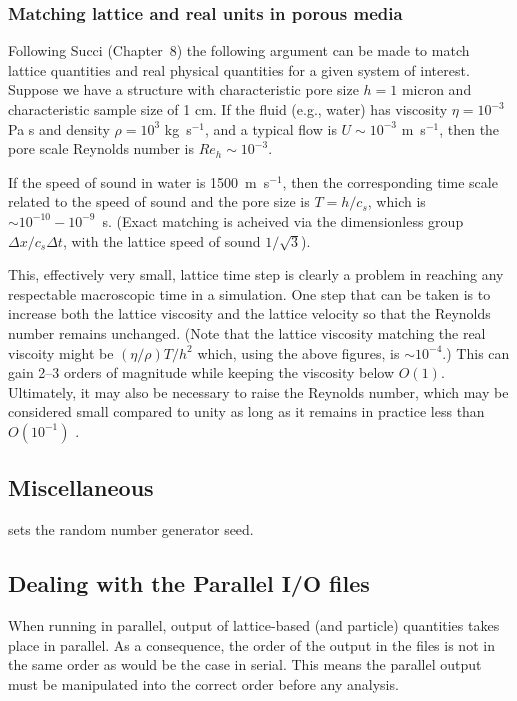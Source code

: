\subsubsection{Matching lattice and real units in porous media}

Following Succi \cite{succi} (Chapter~8) the following argument
can be made to match lattice quantities and real physical
quantities for a given system of interest. Suppose we have
a structure with characteristic pore size $h = 1$ micron
and characteristic sample size of 1 cm. If the fluid
(e.g., water) has viscosity $\eta = 10^{-3}$ Pa s and density
$\rho = 10^3$ kg~s$^{-1}$, and a typical flow is
$U \sim 10^{-3}$ m~s$^{-1}$, then the pore scale Reynolds
number is $Re_h \sim 10^{-3}$.

If the speed of sound in water is 1500~m~s$^{-1}$,
then the corresponding time scale related to the
speed of sound and the pore size is $T = h/ c_s$,
which is $\sim 10^{-10}-10^{-9}$~s. (Exact matching
is acheived via the dimensionless group $\Delta x / c_s\Delta t$,
with the lattice speed of sound $1/\sqrt{3}$).

This, effectively very small, lattice
time step is clearly a problem in reaching any respectable 
macroscopic time in a simulation.
One step that can be taken is to increase both the lattice
viscosity and the lattice velocity so that the Reynolds number
remains unchanged. (Note that the lattice viscosity matching
the real viscoity might be $(\eta/\rho)T/h^2$ which, using the
above figures, is $\sim 10^{-4}$.) This can gain 2--3 orders
of magnitude while keeping the viscosity below $O(1)$. Ultimately,
it may also be necessary to raise the Reynolds number, which may
be considered small compared to unity as long as it remains
in practice less than $O(10^{-1})$ \cite{cates_scaling}.


\subsection{Miscellaneous}


sets the random number generator seed.

\subsection{Dealing with the Parallel I/O files}

When running in parallel, output of lattice-based (and particle)
quantities takes place in parallel. As a consequence, the order
of the output in the files is not in the same order as would be
the case in serial. This means the parallel output must be
manipulated into the correct order before any analysis.


